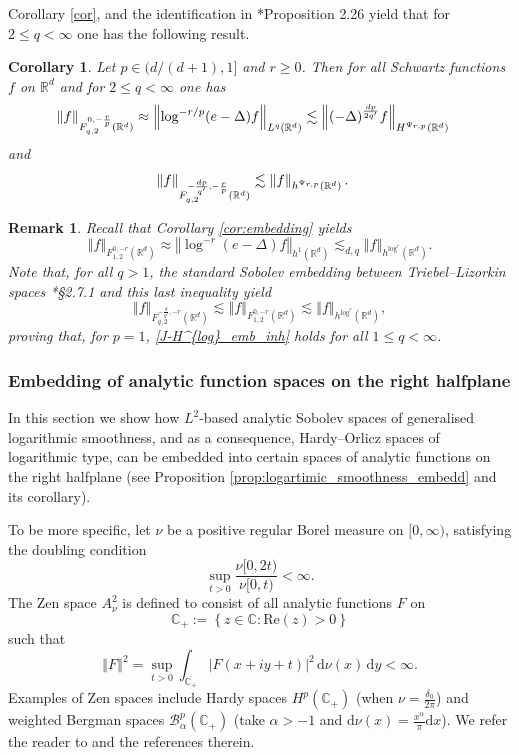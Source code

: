 \documentclass[a4paper, leqno, 10pt]{amsart}
\numberwithin{equation}{section}
\newtheorem{corollary}[thm]{Corollary}
\newtheorem{rmk}[thm]{Remark}
\newcommand{\dd}{\mathrm{d}}
\newcommand{\R}{\mathbb{R}}
\newcommand{\norm}[1]{\left\Vert#1\right\Vert}
\newcommand{\set}[1]{\left\{#1\right\}}
\newcommand{\C}{\mathbb{C}}
\begin{document}
Corollary \ref{cor}, and the identification in \cite{AR}*{Proposition 2.26} yield that for $2\leq q < \infty$ one has the following result.
\begin{corollary}\label{cor:Sobolev-embedding_local}
Let $p \in (d/(d+1), 1]$ and $r\geq 0$. Then for all Schwartz functions $f$ on $\R^d$ and for $2\leq q<\infty$ one has
\begin{equation}\label{J-H^{log}_emb}
\begin{split}
\norm{f}_{F^{0,-\frac r p}_{q,2}(\R^d)}&\approx \norm{\log^{-r/p}(e-\Delta)f}_{L^q (\R^d)}\lesssim \norm{ (-\Delta)^{\frac{dp}{2q'}} f}_{H^{\Psi_{r,p}} (\R^d)}
\end{split}
\end{equation}
and 
\begin{equation}\label{J-H^{log}_emb_inh}
\begin{split}
\norm{f}_{F^{-\frac{dp}{q'},-\frac{r}{p}}_{q,2}(\R^d)}&\lesssim \norm{f}_{h^{\Psi_{r,p}} (\R^d)}.
\end{split}
\end{equation}
\end{corollary}

\begin{rmk}
Recall that Corollary \ref{cor:embedding}  yields
\[
\norm{f}_{F^{0,-r}_{1,2}(\R^d)}\approx \norm{\log^{-r}(e-\Delta)f}_{h^1 (\R^d)} \lesssim_{d,q} \norm{ f}_{h^{\log^r} (\R^d)}.
\]
Note that, for all $q>1$, the standard Sobolev embedding between Triebel--Lizorkin spaces \cite{Tri83}*{\S 2.7.1} and this last inequality yield 
\[
\norm{f}_{F^{-\frac{d}{q'},-r}_{q,2}(\R^d)}\lesssim\norm{f}_{F^{0,-r}_{1,2}(\R^d)}\lesssim \norm{f}_{h^{\log^r} (\R^d)},
\]
proving that, for $p=1$, \eqref{J-H^{log}_emb_inh} holds for all $1\leq q<\infty$. 
\end{rmk}

\subsubsection{Embedding of analytic function spaces on the right halfplane}
%
In this section we show how $L^2$-based analytic Sobolev spaces of generalised logarithmic smoothness, and as a consequence, Hardy--Orlicz spaces of logarithmic type, can be embedded into certain spaces of analytic functions on the right halfplane (see Proposition \ref{prop:logartimic_smoothness_embedd} and its corollary). 

To be more specific, let $\nu$ be a positive regular Borel measure on $[0,\infty)$,  satisfying the doubling condition
\begin{equation}\label{eq:doubling}
\sup_{t>0} \frac{\nu[0,2t)}{\nu[0,t)} < \infty.
\end{equation}
The Zen space $A^2_\nu$ is defined to consist of all analytic  functions $F$ on \[\C_+:=\set{z\in \C: \mathrm{Re}(z)>0}\]
such that 
\[
\norm{F}^2=\sup_{t>0} \int_{\overline{\C_+}} |F(x+iy+t)|^2 \, \dd \nu(x) \, \dd y< \infty.
\]
Examples of Zen spaces include Hardy spaces
$H^p(\C_+)$ (when $\nu=\frac{\delta_0}{2\pi}$) and weighted Bergman
spaces $\mathcal{B}^p_\alpha(\C_ +)$ (take $\alpha>-1$ and $\dd \nu(x)=\frac{x^\alpha}{\pi}\dd x$). We refer the reader to \cites{JPP, Harp1, Harp2} and the references therein.
\end{document}
